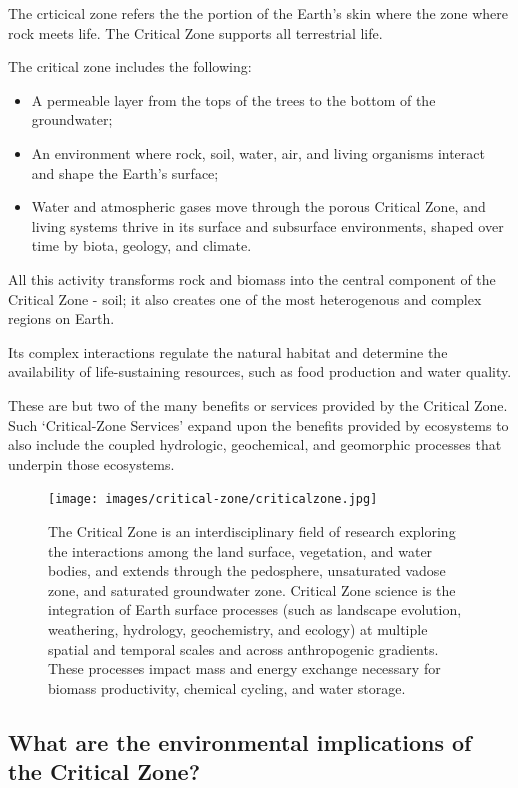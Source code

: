 \documentclass{book}\usepackage{knitr}
\begin{document}
The crticical zone refers the the portion of the Earth's skin where the zone where rock meets life. The Critical Zone supports all terrestrial life.

The critical zone includes the following:

\begin{itemize}
  \item A permeable layer from the tops of the trees to the bottom of the groundwater;
  \item An environment where rock, soil, water, air, and living organisms interact and shape the Earth's surface;
  \item Water and atmospheric gases move through the porous Critical Zone, and living systems thrive in its surface and subsurface environments, shaped over time by biota, geology, and climate.
\end{itemize}

All this activity transforms rock and biomass into the central component of the Critical Zone - soil; it also creates one of the most heterogenous and complex regions on Earth.

Its complex interactions regulate the natural habitat and determine the availability of life-sustaining resources, such as food production and water quality.

These are but two of the many benefits or services provided by the Critical Zone. Such `Critical-Zone Services' expand upon the benefits provided by ecosystems to also include the coupled hydrologic, geochemical, and geomorphic processes that underpin those ecosystems.

\begin{figure}
\texttt{[image: images/critical-zone/criticalzone.jpg]}
\caption{The Critical Zone is an interdisciplinary field of research exploring the interactions among the land surface, vegetation, and water bodies, and extends through the pedosphere, unsaturated vadose zone, and saturated groundwater zone. Critical Zone science is the integration of Earth surface processes (such as landscape evolution, weathering, hydrology, geochemistry, and ecology) at multiple spatial and temporal scales and across anthropogenic gradients. These processes impact mass and energy exchange necessary for biomass productivity, chemical cycling, and water storage.}
\label{fig:criticalzone}
\end{figure}

\subsection{What are the environmental implications of the Critical Zone?}
\end{document}
